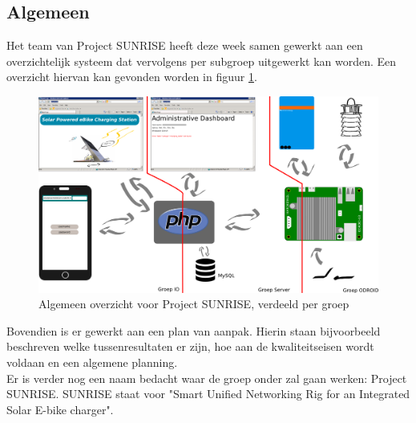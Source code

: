 \subsection*{Algemeen}
Het team van Project SUNRISE heeft deze week samen gewerkt aan een overzichtelijk systeem dat vervolgens per subgroep uitgewerkt kan worden. Een overzicht hiervan kan gevonden worden in figuur \ref{fig:algemeen_overzicht}.\\

\begin{figure}[htbp]
\centering
\includegraphics[width=1\textwidth]{project_overview.png}
\caption{Algemeen overzicht voor Project SUNRISE, verdeeld per groep}\label{fig:algemeen_overzicht}
\end{figure}

Bovendien is er gewerkt aan een plan van aanpak. Hierin staan bijvoorbeeld beschreven welke tussenresultaten er zijn, hoe aan de kwaliteitseisen wordt voldaan en een algemene planning.\\

Er is verder nog een naam bedacht waar de groep onder zal gaan werken: Project SUNRISE. SUNRISE staat voor "Smart Unified Networking Rig for an Integrated Solar E-bike charger".